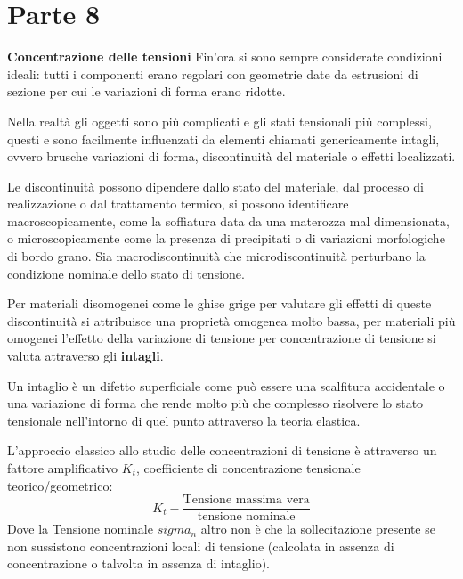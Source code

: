\documentclass{article}
\def\outcome{\textbf{Learning Outcomes:} Outcomes go here. }
\begin{document}
	\section*{Parte 8} %

\begin{adjustwidth}{2in}{} 
	
\textbf{{\Large Concentrazione delle tensioni}} \mbox{} \newline
		Fin'ora si sono sempre considerate condizioni ideali: tutti i componenti erano regolari con geometrie date da estrusioni di sezione per cui le variazioni di forma erano ridotte. \newline 
		
		Nella realtà gli oggetti sono più complicati e gli stati tensionali più complessi, questi e sono facilmente influenzati da  elementi chiamati genericamente intagli, ovvero brusche variazioni di forma, discontinuità del materiale o effetti localizzati. 
		
		Le discontinuità possono dipendere  dallo stato del materiale, dal processo di realizzazione o dal trattamento termico, si possono identificare macroscopicamente, come la soffiatura data da una materozza mal dimensionata, o microscopicamente come la presenza di precipitati o di variazioni morfologiche di bordo grano. 
		Sia macrodiscontinuità che microdiscontinuità perturbano la condizione nominale dello stato di tensione. 
		
		Per materiali disomogenei come le ghise grige per valutare gli effetti di queste discontinuità si attribuisce una proprietà omogenea molto bassa, per materiali più omogenei l'effetto della variazione di tensione per concentrazione di tensione si valuta attraverso gli \textbf{intagli}.  \newline 
		
		Un intaglio è un difetto superficiale come può essere una scalfitura accidentale o una variazione di forma che rende molto più che complesso risolvere lo stato tensionale nell'intorno di quel punto attraverso la teoria elastica. \newline
		
		L'approccio classico allo studio delle concentrazioni di tensione è attraverso un fattore amplificativo $K_t$, coefficiente di concentrazione tensionale teorico/geometrico:
		\[K_t - \dfrac{\text{Tensione massima vera}}{\text{tensione nominale}}\]
		Dove la Tensione nominale $sigma_n$ altro non è che la
		sollecitazione presente se non sussistono concentrazioni locali di tensione (calcolata in assenza di
		concentrazione o talvolta in assenza di intaglio). 
		

\end{adjustwidth}
\end{document}
